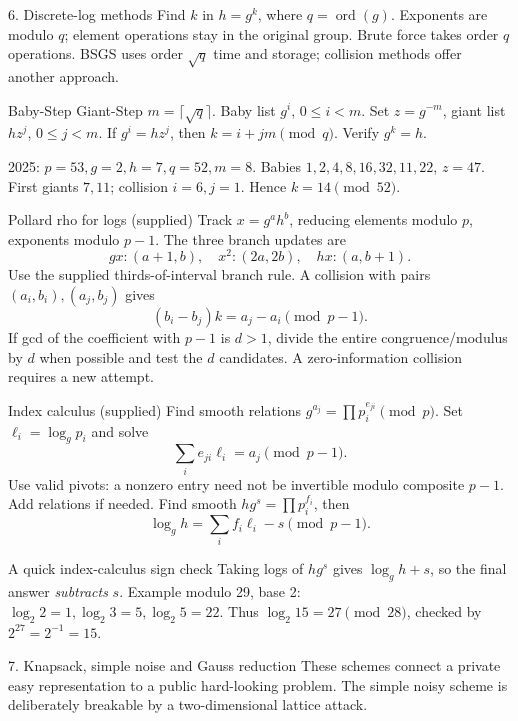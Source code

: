 \documentclass[11pt,a4paper]{article}
\begin{document}
\clearpage
\begin{concept}{6. Discrete-log methods}
Find \(k\) in \(h=g^k\), where \(q=\operatorname{ord}(g)\). Exponents are modulo \(q\); element operations stay in the original group. Brute force takes order \(q\) operations. BSGS uses order \(\sqrt q\) time and storage; collision methods offer another approach.
\end{concept}
\begin{method}{Baby-Step Giant-Step}
\(m=\lceil\sqrt q\rceil\). Baby list \(g^i\), \(0\le i<m\). Set \(z=g^{-m}\), giant list \(hz^j\), \(0\le j<m\). If \(g^i=hz^j\), then \(k=i+jm\pmod q\). Verify \(g^k=h\).

2025: \(p=53,g=2,h=7,q=52,m=8\). Babies \(1,2,4,8,16,32,11,22\), \(z=47\). First giants \(7,11\); collision \(i=6,j=1\). Hence \(k=14\pmod{52}\).
\end{method}
\begin{method}{Pollard rho for logs (supplied)}
Track \(x=g^ah^b\), reducing elements modulo \(p\), exponents modulo \(p-1\). The three branch updates are
\[gx:(a+1,b),\quad x^2:(2a,2b),\quad hx:(a,b+1).\]
Use the supplied thirds-of-interval branch rule. A collision with pairs \((a_i,b_i),(a_j,b_j)\) gives
\[(b_i-b_j)k=a_j-a_i\pmod{p-1}.\]
If gcd of the coefficient with \(p-1\) is \(d>1\), divide the entire congruence/modulus by \(d\) when possible and test the \(d\) candidates. A zero-information collision requires a new attempt.
\end{method}
\begin{method}{Index calculus (supplied)}
Find smooth relations \(g^{a_j}=\prod p_i^{e_{ji}}\pmod p\). Set \(\ell_i=\log_gp_i\) and solve
\[\sum_i e_{ji}\ell_i=a_j\pmod{p-1}.\]
Use valid pivots: a nonzero entry need not be invertible modulo composite \(p-1\). Add relations if needed. Find smooth \(hg^s=\prod p_i^{f_i}\), then
\[\boxed{\log_gh=\sum_i f_i\ell_i-s\pmod{p-1}.}\]
\end{method}
\begin{tip}{A quick index-calculus sign check}
Taking logs of \(hg^s\) gives \(\log_gh+s\), so the final answer \emph{subtracts} \(s\). Example modulo 29, base 2: \(\log_2 2=1,\log_2 3=5,\log_2 5=22\). Thus \(\log_2 15=27\pmod{28}\), checked by \(2^{27}=2^{-1}=15\).
\end{tip}
\clearpage
\begin{concept}{7. Knapsack, simple noise and Gauss reduction}
These schemes connect a private easy representation to a public hard-looking problem. The simple noisy scheme is deliberately breakable by a two-dimensional lattice attack.
\end{concept}
\end{document}
